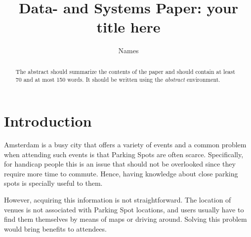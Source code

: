 \documentclass[runningheads,a4paper]{../../StyleFiles/llncs}
\begin{document}
\mainmatter  %

\title{Data- and Systems Paper: your title here}


%
%
\author{Names}
%


\maketitle


\begin{abstract}
The abstract should summarize the contents of the paper and should
contain at least 70 and at most 150 words. It should be written using the
\emph{abstract} environment.
\end{abstract}


\section{Introduction}
Amsterdam is a busy city that offers a variety of events and a common problem when attending such events is that Parking Spots are often scarce. Specifically, for handicap people this is an issue that should not be overlooked since they require more time to commute. Hence, having knowledge about close parking spots is specially useful to them. 

However, acquiring this information is not straightforward. The location of venues is not associated with Parking Spot locations, and users usually have to find them themselves by means of maps or driving around. Solving this problem would bring benefits to attendees. %
\end{document}
